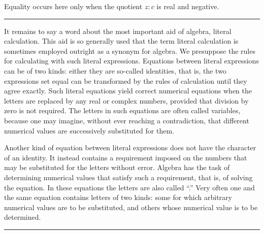 Equality occurs here only when the quotient $z:c$ is real and
negative.

\begin{center}
\rule{0.18\linewidth}{0.4pt}
\end{center}

It remains to say a word about the most important aid of algebra,
literal calculation. This aid is so generally used that the term
literal calculation is sometimes employed outright as a synonym for
algebra. We presuppose the rules for calculating with such literal
expressions. Equations between literal expressions can be of two
kinds: either they are so-called identities, that is, the two
expressions set equal can be transformed by the rules of calculation
until they agree exactly. Such literal equations yield correct
numerical equations when the letters are replaced by any real or
complex numbers, provided that division by zero is not required. The
letters in such equations are often called variables, because one may
imagine, without ever reaching a contradiction, that different
numerical values are successively substituted for them.

Another kind of equation between literal expressions does not have the
character of an identity. It instead contains a requirement imposed on
the numbers that may be substituted for the letters without error.
Algebra has the task of determining numerical values that satisfy such
a requirement, that is, of solving the equation. In these equations
the letters are also called ``.'' Very often one
and the same equation contains letters of two kinds: some for which
arbitrary numerical values are to be substituted, and others whose
numerical value is to be determined.

\begin{center}
\rule{0.24\linewidth}{0.4pt}
\end{center}
